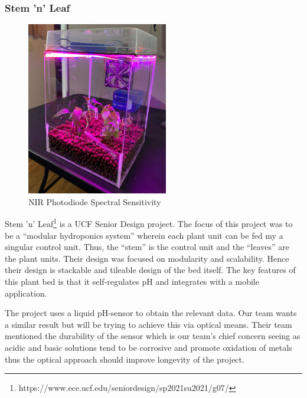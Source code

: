 \subsubsection{Stem 'n' Leaf}

\begin{figure}[H]
    \caption{NIR Photodiode Spectral Sensitivity}
    \centering
    \includegraphics[width=\textwidth]{images/3.1.5Pic.png}
\end{figure}

Stem 'n' Leaf\footnote{https://www.ece.ucf.edu/seniordesign/sp2021su2021/g07/} is a UCF Senior Design project. The focus of this project was to be a ``modular hydroponics system'' wherein each plant unit can be fed my a singular control unit. Thus, the ``stem'' is the control unit and the ``leaves'' are the plant units. Their design was focused on modularity and scalability. Hence their design is stackable and tileable design of the bed itself. The key features of this plant bed is that it self-regulates pH and integrates with a mobile application.

The project uses a liquid pH-sensor to obtain the relevant data. Our team wants a similar result but will be trying to achieve this via optical means. Their team mentioned the durability of the sensor which is our team's chief concern seeing as acidic and basic solutions tend to be corrosive and promote oxidation of metals thus the optical approach should improve longevity of the project. 

